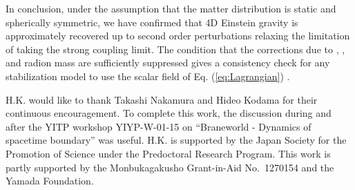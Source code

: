 \documentclass[a4paper,showpacs,preprintnumbers,amsmath,amssymb]{revtex4}
\begin{document}
In conclusion, under the assumption that the matter distribution is static and spherically symmetric, we have confirmed that 4D Einstein gravity is approximately recovered up to second order perturbations relaxing the limitation of taking the strong coupling limit. 
The condition that the corrections due to \myHighlight{$\alpha_\pm$}\coordHE{}, \myHighlight{$\beta_\pm$}\coordHE{}, and radion mass are sufficiently suppressed gives a consistency check for any stabilization model to use the scalar field of Eq. (\ref{eq:Lagrangian}) \cite{Gibbons:2001tf}.



\begin{acknowledgments}
H.K. would like to thank Takashi Nakamura and Hideo Kodama for their continuous encouragement. To complete this work, the discussion during and after the YITP workshop YIYP-W-01-15 on ``Braneworld - Dynamics of spacetime boundary'' was useful. 
H.K. is supported by the Japan Society for the Promotion of Science under the Predoctoral Research Program. 
This work is partly supported by the Monbukagakusho Grant-in-Aid No.~1270154  and the Yamada Foundation. 



\end{acknowledgments} 









\appendix
\end{document}
